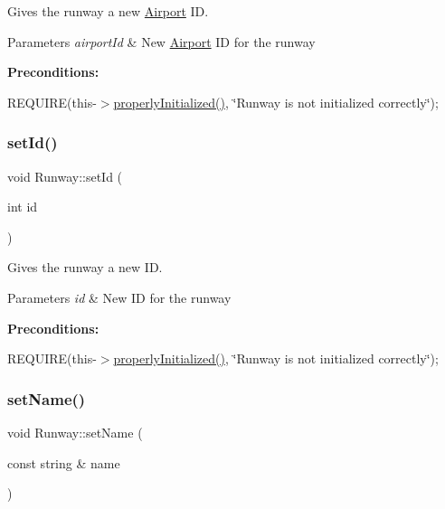 Gives the runway a new \mbox{\hyperlink{class_airport}{Airport}} ID. 


\begin{DoxyParams}{Parameters}
{\em airport\+Id} & New \mbox{\hyperlink{class_airport}{Airport}} ID for the runway\\
\hline
\end{DoxyParams}
{\bfseries Preconditions\+:}
\begin{DoxyItemize}
\item R\+E\+Q\+U\+I\+RE(this-\/$>$\mbox{\hyperlink{class_runway_a360d98246cabf3aa929765f81a656348}{properly\+Initialized()}}, \char`\"{}\+Runway is not initialized correctly\char`\"{}); 
\end{DoxyItemize}\mbox{\label{class_runway_af587fc8f841c10a99427cf7a0f442fce}} 
\subsubsection{\texorpdfstring{set\+Id()}{setId()}}
{\footnotesize\ttfamily void Runway\+::set\+Id (\begin{DoxyParamCaption}\item[{int}]{id }\end{DoxyParamCaption})}



Gives the runway a new ID. 


\begin{DoxyParams}{Parameters}
{\em id} & New ID for the runway\\
\hline
\end{DoxyParams}
{\bfseries Preconditions\+:}
\begin{DoxyItemize}
\item R\+E\+Q\+U\+I\+RE(this-\/$>$\mbox{\hyperlink{class_runway_a360d98246cabf3aa929765f81a656348}{properly\+Initialized()}}, \char`\"{}\+Runway is not initialized correctly\char`\"{}); 
\end{DoxyItemize}\mbox{\label{class_runway_ab601d0a69ecffc0042d69cf0eb0cdaba}} 
\subsubsection{\texorpdfstring{set\+Name()}{setName()}}
{\footnotesize\ttfamily void Runway\+::set\+Name (\begin{DoxyParamCaption}\item[{const string \&}]{name }\end{DoxyParamCaption})}



